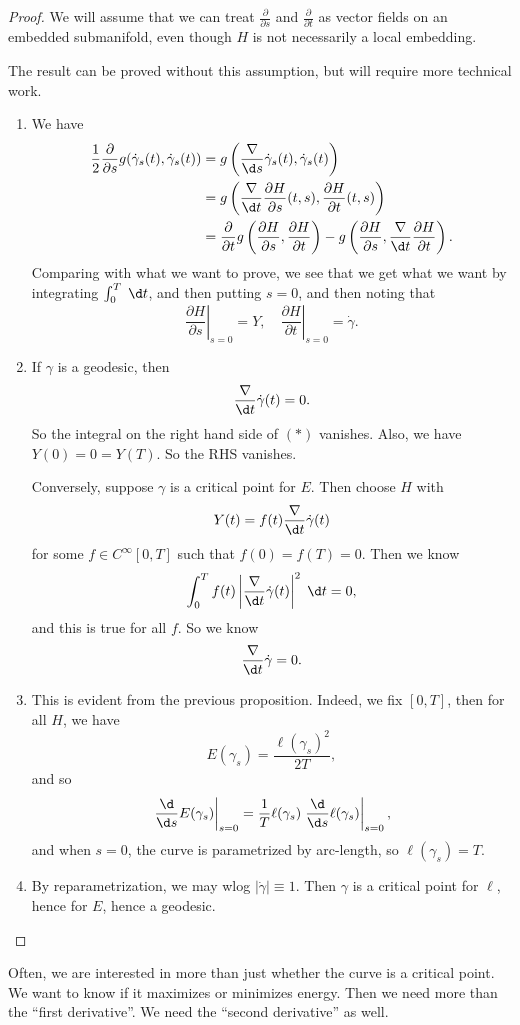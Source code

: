\documentclass[a4paper]{article}
\begin{document}
\begin{proof}
  We will assume that we can treat $\frac{\partial}{\partial s}$ and $\frac{\partial}{\partial t}$ as vector fields on an embedded submanifold, even though $H$ is not necessarily a local embedding.

  The result can be proved without this assumption, but will require more technical work.
  \begin{enumerate}
    \item We have
      \begin{align*}
        \frac{1}{2} \frac{\partial}{\partial s} g(\dot{\gamma}_s(t), \dot{\gamma}_s(t)) &= g\left(\frac{\nabla}{\d s} \dot{\gamma}_s(t), \dot{\gamma}_s(t)\right)\\
        &= g\left(\frac{\nabla}{\d t} \frac{\partial H}{\partial s}(t, s), \frac{\partial H}{\partial t} (t, s)\right)\\
        &= \frac{\partial}{\partial t} g\left(\frac{\partial H}{\partial s}, \frac{\partial H}{\partial t}\right) - g \left(\frac{\partial H}{\partial s}, \frac{\nabla}{\d t} \frac{\partial H}{\partial t}\right).
      \end{align*}
      Comparing with what we want to prove, we see that we get what we want by integrating $\int_0^T\;\d t$, and then putting $s = 0$, and then noting that
      \[
        \left.\frac{\partial H}{\partial s}\right|_{s = 0} = Y,\quad \left.\frac{\partial H}{\partial t}\right|_{s = 0} = \dot{\gamma}.
      \]
    \item If $\gamma$ is a geodesic, then
      \[
        \frac{\nabla}{\d t} \dot{\gamma}(t) = 0.
      \]
      So the integral on the right hand side of $(*)$ vanishes. Also, we have $Y(0) = 0 = Y(T)$. So the RHS vanishes.

      Conversely, suppose $\gamma$ is a critical point for $E$. Then choose $H$ with
      \[
        Y(t) = f(t) \frac{\nabla}{\d t} \dot{\gamma}(t)
      \]
      for some $f \in C^\infty[0, T]$ such that $f(0) = f(T) = 0$. Then we know
      \[
        \int_0^T f(t) \left|\frac{\nabla}{\d t} \dot{\gamma}(t)\right|^2 \;\d t = 0,
      \]
      and this is true for all $f$. So we know
      \[
        \frac{\nabla}{\d t}\dot{\gamma} = 0.
      \]
    \item This is evident from the previous proposition. Indeed, we fix $[0, T]$, then for all $H$, we have
      \[
        E(\gamma_s) = \frac{\ell (\gamma_s)^2}{2T},
      \]
      and so
      \[
        \left.\frac{\d}{\d s} E(\gamma_s)\right|_{s = 0} = \frac{1}{T} \ell(\gamma_s) \left.\frac{\d}{\d s}\ell(\gamma_s) \right|_{s = 0},
      \]
     and when $s = 0$, the curve is parametrized by arc-length, so $\ell(\gamma_s) = T$.
   \item By reparametrization, we may wlog $|\dot{\gamma}| \equiv 1$. Then $\gamma$ is a critical point for $\ell$, hence for $E$, hence a geodesic.
  \end{enumerate}
\end{proof}
Often, we are interested in more than just whether the curve is a critical point. We want to know if it maximizes or minimizes energy. Then we need more than the ``first derivative''. We need the ``second derivative'' as well.
\end{document}
